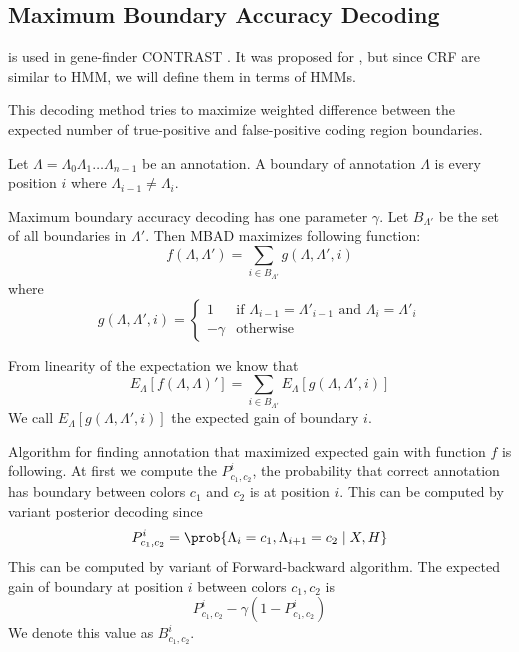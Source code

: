 \subsection{Maximum Boundary Accuracy Decoding}

 is used in gene-finder
CONTRAST \cite{Gross2007}. It
was proposed for , but since CRF
are similar to HMM, we will define them in terms of HMMs.

This decoding method tries to maximize weighted difference between the expected
number of true-positive and false-positive coding region boundaries.

\begin{definition}
Let $\Lambda=\Lambda_0\Lambda_1\dots\Lambda_{n-1}$ be an annotation. A boundary of
annotation $\Lambda$ is every position $i$ where $\Lambda_{i-1}\not=\Lambda_i$. 
\end{definition}

Maximum boundary accuracy decoding has one parameter $\gamma$. Let $B_{\Lambda'}$ be the
set of all boundaries in $\Lambda'$. Then MBAD maximizes following function:
\begin{equation}
f(\Lambda,\Lambda')=\sum_{i\in B_{\Lambda'}}g(\Lambda,\Lambda',i)
\end{equation}
where 
\begin{equation}
g(\Lambda,\Lambda',i)=
\begin{cases}
1 & \text{if $\Lambda_{i-1}=\Lambda'_{i-1}$ and $\Lambda_{i}=\Lambda'_{i}$}\\
-\gamma& \text{otherwise}
\end{cases}
\end{equation}

From linearity of the expectation we know that
\[E_{\Lambda}[f(\Lambda,\Lambda)']=\sum_{i\in
B_{\Lambda'}}E_{\Lambda}[g(\Lambda,\Lambda',i)]\] We call
$E_{\Lambda}[g(\Lambda,\Lambda',i)]$ the expected gain of boundary $i$.


Algorithm for finding annotation that maximized expected gain with function $f$
is following. At first we compute the $P^i_{c_1,c_2}$, the probability that correct annotation
has boundary between colors $c_1$ and $c_2$ is at position $i$. This can be computed by variant posterior decoding
since 
\[P_{c_1,c_2}^i=\prob{\Lambda_i=c_1,\Lambda_{i+1}=c_2\mid X,H}\]  
This
can be computed by variant of Forward-backward algorithm.  The expected gain of
boundary at position $i$ between colors $c_1,c_2$  is 
\[P^i_{c_1,c_2}-\gamma (1-P^i_{c_1,c_2})\]
We denote this value as  $B^i_{c_1,c_2}$.

